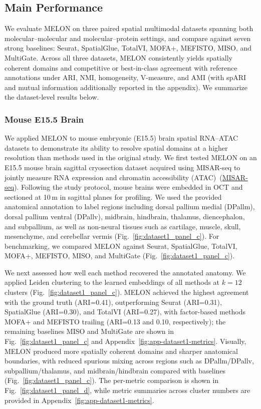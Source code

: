 \documentclass{article}
\theoremstyle{plain}
\theoremstyle{definition}
\begin{document}
\subsection{Main Performance}
We evaluate MELON on three paired spatial multimodal datasets spanning both molecular--molecular and molecular--protein settings, and compare against seven strong baselines: Seurat, SpatialGlue, TotalVI, MOFA+, MEFISTO, MISO, and MultiGate. Across all three datasets, MELON consistently yields spatially coherent domains and competitive or best-in-class agreement with reference annotations under ARI, NMI, homogeneity, V-measure, and AMI (with spARI and mutual information additionally reported in the appendix). We summarize the dataset-level results below.

\subsubsection{Mouse E15.5 Brain}
We applied MELON to mouse embryonic (E15.5) brain spatial RNA--ATAC datasets to demonstrate its ability to resolve spatial domains at a higher resolution than methods used in the original study. We first tested MELON on an E15.5 mouse brain sagittal cryosection dataset acquired using MISAR-seq to jointly measure RNA expression and chromatin accessibility (ATAC)~(\href{https://www.nature.com/articles/s41592-023-01884-1}{MISAR-seq}). Following the study protocol, mouse brains were embedded in OCT and sectioned at 10\,\textmu m in sagittal planes for profiling. We used the provided anatomical annotation to label regions including dorsal pallium medial (DPallm), dorsal pallium ventral (DPallv), midbrain, hindbrain, thalamus, diencephalon, and subpallium, as well as non-neural tissues such as cartilage, muscle, skull, mesenchyme, and cerebellar vermis (Fig.~\ref{fig:dataset1_panel_c}). For benchmarking, we compared MELON against Seurat, SpatialGlue, TotalVI, MOFA+, MEFISTO, MISO, and MultiGate (Fig.~\ref{fig:dataset1_panel_c}).

We next assessed how well each method recovered the annotated anatomy. We applied Leiden clustering to the learned embeddings of all methods at $k=12$ clusters (Fig.~\ref{fig:dataset1_panel_c}). MELON achieved the highest agreement with the ground truth (ARI=0.41), outperforming Seurat (ARI=0.31), SpatialGlue (ARI=0.30), and TotalVI (ARI=0.27), with factor-based methods MOFA+ and MEFISTO trailing (ARI=0.13 and 0.10, respectively); the remaining baselines MISO and MultiGate are shown in Fig.~\ref{fig:dataset1_panel_c} and Appendix~\ref{fig:app-dataset1-metrics}. Visually, MELON produced more spatially coherent domains and sharper anatomical boundaries, with reduced spurious mixing across regions such as DPallm/DPallv, subpallium/thalamus, and midbrain/hindbrain compared with baselines (Fig.~\ref{fig:dataset1_panel_c}). The per-metric comparison is shown in Fig.~\ref{fig:dataset1_panel_d}, while metric summaries across cluster numbers are provided in Appendix~\ref{fig:app-dataset1-metrics}.
\end{document}
